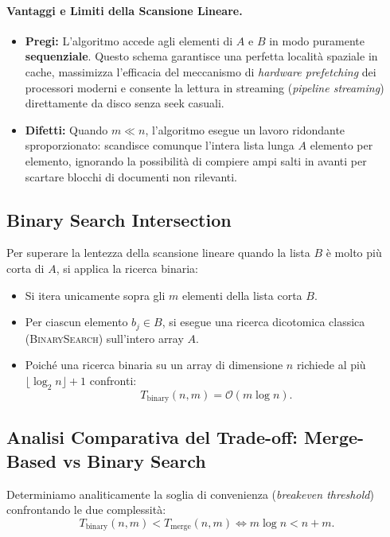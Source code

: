 \paragraph{Vantaggi e Limiti della Scansione Lineare.}
\begin{itemize}
  \item \textbf{Pregi:} L'algoritmo accede agli elementi di $A$ e $B$ in modo puramente \textbf{sequenziale}. Questo schema garantisce una perfetta località spaziale in cache, massimizza l'efficacia del meccanismo di \textit{hardware prefetching} dei processori moderni e consente la lettura in streaming (\textit{pipeline streaming}) direttamente da disco senza seek casuali.
  \item \textbf{Difetti:} Quando $m \ll n$, l'algoritmo esegue un lavoro ridondante sproporzionato: scandisce comunque l'intera lista lunga $A$ elemento per elemento, ignorando la possibilità di compiere ampi salti in avanti per scartare blocchi di documenti non rilevanti.
\end{itemize}

\subsection{Binary Search Intersection}
Per superare la lentezza della scansione lineare quando la lista $B$ è molto più corta di $A$, si applica la ricerca binaria:
\begin{itemize}
  \item Si itera unicamente sopra gli $m$ elementi della lista corta $B$.
  \item Per ciascun elemento $b_j \in B$, si esegue una ricerca dicotomica classica (\textsc{BinarySearch}) sull'intero array $A$.
  \item Poiché una ricerca binaria su un array di dimensione $n$ richiede al più $\lfloor \log_2 n \rfloor + 1$ confronti:
  \begin{equation}
    T_{\text{binary}}(n, m) = \mathcal{O}(m \log n).
  \end{equation}
\end{itemize}

\subsection{Analisi Comparativa del Trade-off: Merge-Based vs Binary Search}
Determiniamo analiticamente la soglia di convenienza (\textit{breakeven threshold}) confrontando le due complessità:
\begin{equation}
  T_{\text{binary}}(n, m) < T_{\text{merge}}(n, m) \iff m \log n < n + m.
\end{equation}

